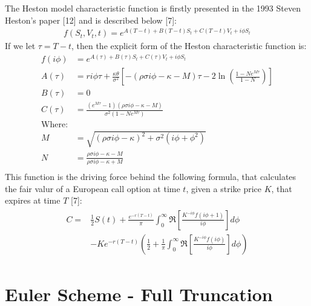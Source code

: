 \documentclass[12pt,twoside]{reedthesis}
\theoremstyle{definition}
\theoremstyle{definition}
\theoremstyle{remark}
\begin{document}
  The Heston model characteristic function is firstly presented in the
  1993 Steven Heston's paper {[}12{]} and is described below {[}7{]}:
  \begin{align}
  f(S_t, V_t, t) = e^{A(T-t)+B(T-t)S_t + C(T-t)V_t + i \phi S_t}
  \end{align}
  If we let \(\tau = T-t\), then the explicit form of the Heston
  characteristic function is:
  \begin{align*}
  f(i \phi) &= e^{A(\tau)+B(\tau)S_t + C(\tau)V_t + i \phi S_t} \\
  A(\tau) &= r i \phi \tau + \frac{\kappa \theta}{\sigma^2} \left[ - (\rho \sigma i \phi - \kappa - M) \tau - 2 \ln\left(\frac{1-N e^{M \tau}}{1-N}\right) \right] \\
  B(\tau) &= 0 \\
  C(\tau) &= \frac{(e^{M \tau}-1)(\rho \sigma i \phi - \kappa - M)}{\sigma^2 (1-N e^{M \tau})} \\
  \text{Where:} & \\
  M &= \sqrt{(\rho \sigma i \phi - \kappa)^2 + \sigma^2 (i \phi + \phi^2)} \\
  N &= \frac{\rho \sigma i \phi - \kappa - M}{\rho \sigma i \phi - \kappa + M} \\
  \end{align*}
  This function is the driving force behind the following formula, that
  calculates the fair valur of a European call option at time \(t\), given
  a strike price \(K\), that expires at time \(T\) {[}7{]}:
  \begin{align} 
  \label{eq:cfheston}
  \begin{split}
  C = & \frac{1}{2} S(t) + \frac{e^{-r(T-t)}}{\pi}\int_{0}^{\infty}{\Re \left[ \frac{K^{-i \phi} f(i \phi + 1)}{i \phi} \right] d\phi} \\
  & -Ke^{-r(T-t)}\left( \frac{1}{2} + \frac{1}{\pi} \int_{0}^{\infty}{\Re \left[ \frac{K^{-i \phi} f(i \phi)}{i \phi} \right]}  d\phi \right)
  \end{split}
  \end{align}
  \section{Euler Scheme - Full
  Truncation}\label{euler-scheme---full-truncation}
  
\end{document}
